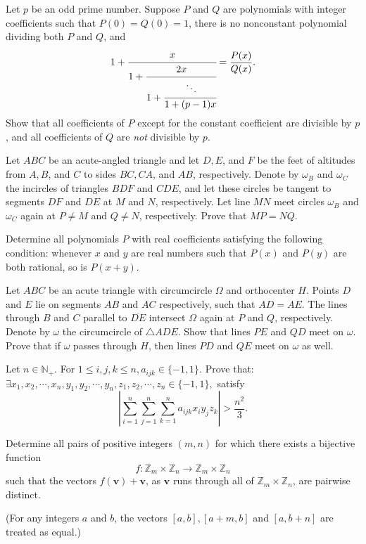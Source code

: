 \documentclass[11pt]{scrartcl}
\begin{document}
\begin{problem}[57065759079551]
Let $p$ be an odd prime number. Suppose $P$ and $Q$ are polynomials with integer coefficients such that $P(0)=Q(0)=1$, there is no nonconstant polynomial dividing both $P$ and $Q$, and
\[
  1 + \cfrac{x}{1 + \cfrac{2x}{1 + \cfrac{\ddots}{1 +
  (p-1)x}}}=\frac{P(x)}{Q(x)}.
\]Show that all coefficients of $P$ except for the constant coefficient are divisible by $p$, and all coefficients of $Q$ are \emph{not} divisible by $p$.
\end{problem}
\begin{problem}[57940096937913]
Let $ABC$ be an acute-angled triangle and let $D, E$, and $F$ be the feet of altitudes from $A, B$, and $C$ to sides $BC, CA$, and $AB$, respectively. Denote by $\omega_B$ and $\omega_C$ the incircles of triangles $BDF$ and $CDE$, and let these circles be tangent to segments $DF$ and $DE$ at $M$ and $N$, respectively. Let line $MN$ meet circles $\omega_B$ and $\omega_C$ again at $P \ne M$ and $Q \ne N$, respectively. Prove that $MP = NQ$.
\end{problem}
\begin{problem}[57940527352528]
	Determine all polynomials $P$ with real coefficients satisfying the following condition: whenever $x$ and $y$ are real numbers such that $P(x)$ and $P(y)$ are both rational, so is $P(x + y)$.
\end{problem}
\begin{problem}[63514716280156]
Let $ABC$ be an acute triangle with circumcircle $\Omega$ and orthocenter $H$. Points $D$ and $E$ lie on segments $AB$ and $AC$ respectively, such that $AD = AE$. The lines through $B$ and $C$ parallel to $\overline{DE}$ intersect $\Omega$ again at $P$ and $Q$, respectively. Denote by $\omega$ the circumcircle of $\triangle ADE$.
Show that lines $PE$ and $QD$ meet on $\omega$.
Prove that if $\omega$ passes through $H$, then lines $PD$ and $QE$ meet on $\omega$ as well.
\end{problem}
\begin{problem}[65055870407598]
Let $n\in\mathbb N_+.$ For $1\leq i,j,k\leq n,a_{ijk}\in\{ -1,1\} .$ Prove that: $\exists x_1,x_2,\cdots ,x_n,y_1,y_2,\cdots ,y_n,z_1,z_2,\cdots ,z_n\in \{-1,1\} ,$ satisfy
$$\left| \sum\limits_{i=1}^n\sum\limits_{j=1}^n\sum\limits_{k=1}^na_{ijk}x_iy_jz_k\right| >\frac {n^2}3.$$
\end{problem}
\begin{problem}[66110871669579]
Determine all pairs of positive integers $(m, n)$ for which there exists a bijective function\[f : \mathbb{Z}_m \times \mathbb{Z}_n \to \mathbb{Z}_m \times \mathbb{Z}_n\]such that the vectors $f(\mathbf{v}) + \mathbf{v}$, as $\mathbf{v}$ runs through all of $\mathbb{Z}_m \times \mathbb{Z}_n$, are pairwise distinct.

(For any integers $a$ and $b$, the vectors $[a, b], [a + m, b]$ and $[a, b + n]$ are treated as equal.)
\end{problem}
\end{document}
